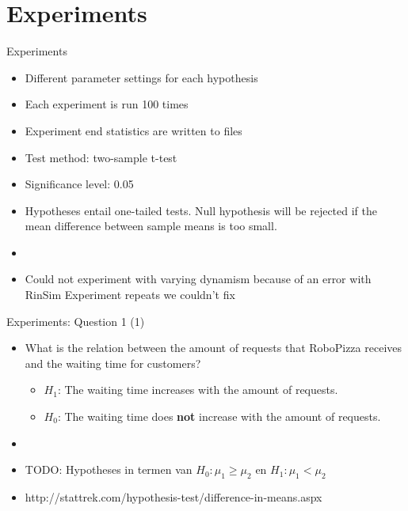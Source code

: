 \section{Experiments}

\begin{frame}{Experiments}
    \begin{itemize}
        \item Different parameter settings for each hypothesis
        \item Each experiment is run 100 times
        \item Experiment end statistics are written to files
        \item Test method: two-sample t-test %
        \item Significance level: 0.05
        \item Hypotheses entail one-tailed tests. Null hypothesis will be rejected if the mean difference between sample means is too small.

        \item[]
        \item Could not experiment with varying dynamism because of an error with RinSim Experiment repeats we couldn't fix
    \end{itemize}
\end{frame}


\begin{frame}{Experiments: Question 1 (1)}
    \begin{itemize}
        \item What is the relation between the amount of requests that RoboPizza receives and the waiting time for customers?
        \begin{itemize}
                \item $H_1$: The waiting time increases with the amount of requests.
                \item $H_0$: The waiting time does \textbf{not} increase with the amount of requests.
        \end{itemize}

        \item[]
        \item TODO: Hypotheses in termen van $H_0: \mu_1 \geq \mu_2$ en $H_1: \mu_1 < \mu_2$
        \item http://stattrek.com/hypothesis-test/difference-in-means.aspx
    \end{itemize}
\end{frame}


